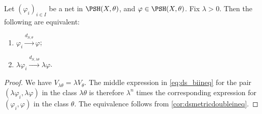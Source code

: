 \begin{lemma}\label{lma:dS_res}
    Let $(\varphi_i)_{i\in I}$ be a net in $\PSH(X,\theta)$, and $\varphi\in \PSH(X,\theta)$. Fix $\lambda>0$. Then the following are equivalent:
    \begin{enumerate}
        \item\label{itm:lma:dS_res:1} $\varphi_i\xrightarrow{d_{S,\theta}}\varphi$;
        \item\label{itm:lma:dS_res:2} $\lambda\varphi_i\xrightarrow{d_{S,\lambda\theta}}\lambda\varphi$.
    \end{enumerate}
\end{lemma}
\begin{proof}
    We have $V_{\lambda\theta}=\lambda V_{\theta}$. The middle expression in \eqref{eq:ds_biineq} for the pair $(\lambda\varphi_i,\lambda\varphi)$ in the class $\lambda\theta$ is therefore $\lambda^n$ times the corresponding expression for $(\varphi_i,\varphi)$ in the class $\theta$. The equivalence follows from \cref{cor:dsmetricdoubleineq}.
\end{proof}



